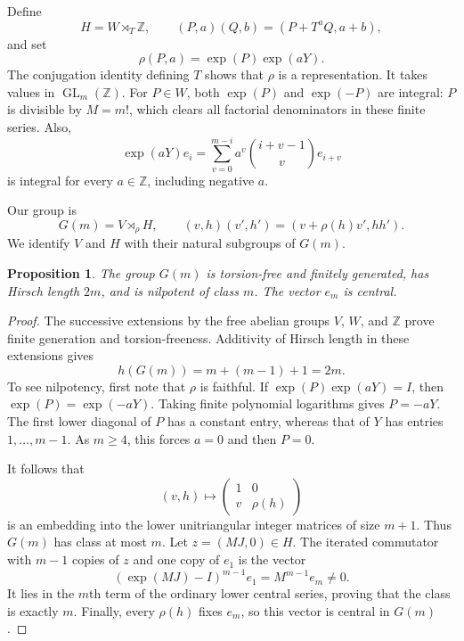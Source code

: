 \documentclass[11pt]{article}
\numberwithin{equation}{section}
\newtheorem{proposition}[theorem]{Proposition}
\theoremstyle{remark}
\newcommand{\Z}{\mathbb Z}
\newcommand{\GL}{\operatorname{GL}}
\begin{document}
Define
\[
 H=W\rtimes_T\Z,\qquad
 (P,a)(Q,b)=(P+T^aQ,a+b),
\]
and set
\begin{equation}\label{eq:rho}
 \rho(P,a)=\exp(P)\exp(aY).
\end{equation}
The conjugation identity defining $T$ shows that $\rho$ is a
representation. It takes values in $\GL_m(\Z)$. For $P\in W$, both
$\exp(P)$ and $\exp(-P)$ are integral: $P$ is divisible by $M=m!$,
which clears all factorial denominators in these finite series. Also,
\begin{equation}\label{eq:expY}
 \exp(aY)e_i=\sum_{v=0}^{m-i}a^v\binom{i+v-1}{v}e_{i+v}
\end{equation}
is integral for every $a\in\Z$, including negative $a$.

Our group is
\begin{equation}\label{eq:Gm}
 G(m)=V\rtimes_\rho H,\qquad
 (v,h)(v',h')=(v+\rho(h)v',hh').
\end{equation}
We identify $V$ and $H$ with their natural subgroups of $G(m)$.

\begin{proposition}\label{prop:group}
The group $G(m)$ is torsion-free and finitely generated, has Hirsch
length $2m$, and is nilpotent of class $m$. The vector $e_m$ is central.
\end{proposition}

\begin{proof}
The successive extensions by the free abelian groups $V$, $W$, and
$\Z$ prove finite generation and torsion-freeness. Additivity of Hirsch
length in these extensions gives
\[
 h(G(m))=m+(m-1)+1=2m.
\]
To see nilpotency, first note that $\rho$ is faithful. If
$\exp(P)\exp(aY)=I$, then $\exp(P)=\exp(-aY)$. Taking finite
polynomial logarithms gives $P=-aY$. The first lower diagonal of $P$
has a constant entry, whereas that of $Y$ has entries $1,\ldots,m-1$.
As $m\ge4$, this forces $a=0$ and then $P=0$.

It follows that
\begin{equation}\label{eq:affine}
 (v,h)\longmapsto
 \begin{pmatrix}1&0\\v&\rho(h)\end{pmatrix}
\end{equation}
is an embedding into the lower unitriangular integer matrices of size
$m+1$. Thus $G(m)$ has class at most $m$. Let $z=(MJ,0)\in H$.
The iterated commutator with $m-1$ copies of $z$ and one copy of $e_1$
is the vector
\[
 (\exp(MJ)-I)^{m-1}e_1=M^{m-1}e_m\ne0.
\]
It lies in the $m$th term of the ordinary lower central series, proving
that the class is exactly $m$. Finally, every $\rho(h)$ fixes $e_m$,
so this vector is central in $G(m)$.
\end{proof}
\end{document}
